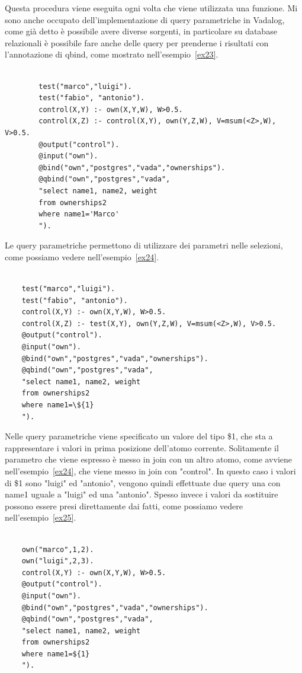 Questa procedura viene eseguita ogni volta che viene utilizzata una funzione. \newline \newline
Mi sono anche occupato dell'implementazione di query parametriche in Vadalog, come già detto è possibile avere diverse sorgenti, in particolare su database relazionali è possibile fare anche delle query per prenderne i risultati con l'annotazione di qbind, come mostrato nell'esempio~\ref{ex23}.
\begin{example}\label{ex23}
	\begin{lstlisting}
		
		test("marco","luigi").
		test("fabio", "antonio").
		control(X,Y) :- own(X,Y,W), W>0.5.
		control(X,Z) :- control(X,Y), own(Y,Z,W), V=msum(<Z>,W), V>0.5.
		@output("control").
		@input("own").
		@bind("own","postgres","vada","ownerships").
		@qbind("own","postgres","vada",
		"select name1, name2, weight 
		from ownerships2
		where name1='Marco'
		").
	\end{lstlisting}
\end{example}
Le query parametriche permettono di utilizzare dei parametri nelle selezioni, come possiamo vedere nell'esempio~\ref{ex24}.
\begin{example}\label{ex24}
	\begin{lstlisting}
	
	test("marco","luigi").
	test("fabio", "antonio").
	control(X,Y) :- own(X,Y,W), W>0.5.
	control(X,Z) :- test(X,Y), own(Y,Z,W), V=msum(<Z>,W), V>0.5.
	@output("control").
	@input("own").
	@bind("own","postgres","vada","ownerships").
	@qbind("own","postgres","vada",
	"select name1, name2, weight 
	from ownerships2
	where name1=\${1}
	").
	\end{lstlisting}
\end{example}
Nelle query parametriche viene specificato un valore del tipo \${1}, che sta a rappresentare i valori in prima posizione dell'atomo corrente. Solitamente il parametro che viene espresso è messo in join con un altro atomo, come avviene nell'esempio~\ref{ex24}, che viene messo in join con "control". In questo caso i valori di \${1} sono "luigi" ed "antonio", vengono quindi effettuate due query una con name1 uguale a "luigi" ed una "antonio". \newline
Spesso invece i valori da sostituire possono essere presi direttamente dai fatti, come possiamo vedere nell'esempio~\ref{ex25}.
\begin{example}\label{ex25}
	\begin{lstlisting}
	
	own("marco",1,2).
	own("luigi",2,3).
	control(X,Y) :- own(X,Y,W), W>0.5.
	@output("control").
	@input("own").
	@bind("own","postgres","vada","ownerships").
	@qbind("own","postgres","vada",
	"select name1, name2, weight 
	from ownerships2
	where name1=${1}
	").
	\end{lstlisting}
\end{example}
